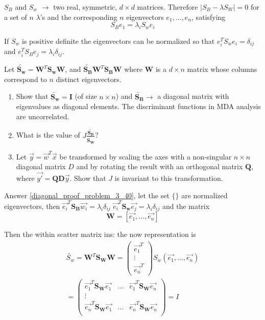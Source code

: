 \documentclass[11pt]{article}
\begin{document}
$S_B$ and $S_w$ $\to$ two real, symmetric, $d \times d$ matrices.  Therefore $|S_B - \lambda S_W | = 0$ for a set of $n$ $\lambda$'s and the corresponding $n$ eigenvectors $e_1, ..., e_n$, satisfying 
\begin{equation}
S_B e_1 = \lambda_i S_w e_i
\end{equation}

If $S_w$ is positive definite the eigenvectors can be normalized so that $e_i ^T S_w e_i = \delta _{ij}$ and $e_i^T S_B e_j = \lambda_i \delta_{ij}$.  

Let $\tilde{\mathbf{S_w}} = \mathbf{W}^T \mathbf{S_w} \mathbf{W}$, and $\tilde{\mathbf{S_B}} \mathbf{W}^T \mathbf{S_B} \mathbf{W}$   where $\mathbf{W}$ is a $d \times n$ matrix whose columns correspond to $n$ distinct eigenvectors.
\begin{enumerate}
	\item Show that $\tilde{\mathbf{S_w}} = \mathbf{I}$ (of size $n\times n$) and $\tilde{\mathbf{S_B}} \to$ a diagonal matrix with eigenvalues as diagonal elements.  The discriminant functions in MDA analysis  are uncorrelated.\label{diagonal_proof_problem_3_40}
	\item What is the value of $J \frac{\tilde{\mathbf{S_B}}}{\tilde{\mathbf{S_W}}}$? \label{part_B_problem_3_40}
	\item Let $\vec{y} = \vec{w}^T \vec{x}$ be transformed by scaling the axes with a non-singular $n \times n$ diagonal matrix $D$ and by rotating the result with an orthogonal matrix $\mathbf{Q}$, where $\vec{y'} = \mathbf{Q} \mathbf{D}\vec{y}$.  Show that $J$ is invariant to this transformation.  \label{part_C_problem_3_40}
\end{enumerate}

Answer \ref{diagonal_proof_problem_3_40}, let the set $\{ \}$ are normalized eigenvectors, then $\vec{e_i}^T\mathbf{S_B}\vec{w_i} = \lambda_i \delta_{ij} $ $\vec{e_i}^T \mathbf{S_w}\vec{e_j} = \lambda_i \delta_{ij}$ and the matrix 
\begin{equation}
\mathbf{W} = [ \vec{e_1} , ..., \vec{e_n}]
\end{equation}


Then the within scatter matrix ins:  the now representation is
\begin{eqnarray}
\tilde{S_w} = \mathbf{W}^T \mathbf{S_W} \mathbf{W} = 
\left(
\begin{array}{l}
\vec{e_1} ^T \\
\vdots \\
\vec{e_n} ^T
\end{array}
\right) 
S_w (\vec{e_1} , ..., \vec{e_n} ) \\
=
\left(
\begin{array}{llll}
\vec{e_1} ^T \mathbf{S_W} \vec{e_1} & ... & \vec{e_1}^T \mathbf{S_W} \vec{e_n} \\
\vdots \\
\vec{e_n} ^T \mathbf{S_W} \vec{e_1} & ... & \vec{e_n}^T \mathbf{S_W} \vec{e_n} \\
\end{array}
\right) = I
\end{eqnarray}
\end{document}
